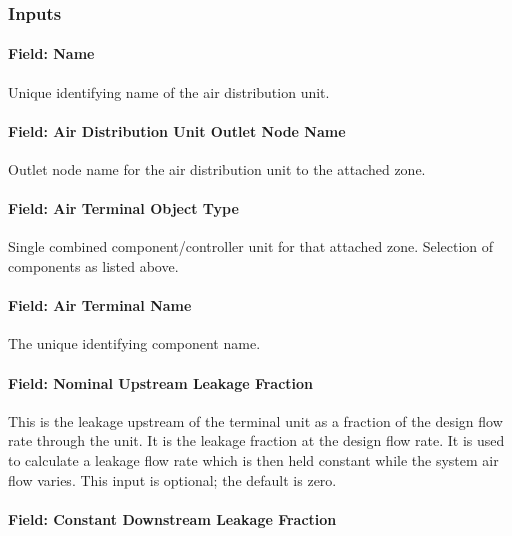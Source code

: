 \subsubsection{Inputs}\label{inputs-055}

\paragraph{Field: Name}\label{field-name-053}

Unique identifying name of the air distribution unit.

\paragraph{Field: Air Distribution Unit Outlet Node Name}\label{field-air-distribution-unit-outlet-node-name}

Outlet node name for the air distribution unit to the attached zone.

\paragraph{Field: Air Terminal Object Type}\label{field-air-terminal-object-type}

Single combined component/controller unit for that attached zone. Selection of components as listed above.

\paragraph{Field: Air Terminal Name}\label{field-air-terminal-name}

The unique identifying component name.

\paragraph{Field: Nominal Upstream Leakage Fraction}\label{field-nominal-upstream-leakage-fraction}

This is the leakage upstream of the terminal unit as a fraction of the design flow rate through the unit. It is the leakage fraction at the design flow rate. It is used to calculate a leakage flow rate which is then held constant while the system air flow varies. This input is optional; the default is zero.

\paragraph{Field: Constant Downstream Leakage Fraction}\label{field-constant-downstream-leakage-fraction}

